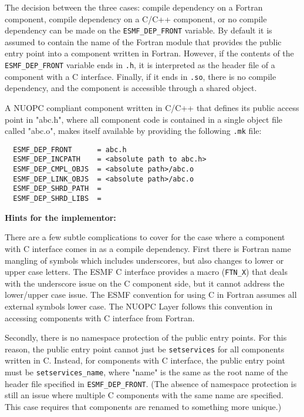 The decision between the three cases: compile dependency on a Fortran component, compile dependency on a C/C++ component, or no compile dependency can be made on the {\tt ESMF\_DEP\_FRONT} variable. By default it is assumed to contain the name of the Fortran module that provides the public entry point into a component written in Fortran. However, if the contents of the {\tt ESMF\_DEP\_FRONT} variable ends in {\tt .h}, it is interpreted as the header file of a component with a C interface. Finally, if it ends in {\tt .so}, there is no compile dependency, and the component is accessible through a shared object.

A NUOPC compliant component written in C/C++ that defines its public access point in "abc.h", where all component code is contained in a single object file called "abc.o", makes itself available by providing the following {\tt .mk} file:

\begin{verbatim}
  ESMF_DEP_FRONT      = abc.h
  ESMF_DEP_INCPATH    = <absolute path to abc.h>
  ESMF_DEP_CMPL_OBJS  = <absolute path>/abc.o
  ESMF_DEP_LINK_OBJS  = <absolute path>/abc.o
  ESMF_DEP_SHRD_PATH  = 
  ESMF_DEP_SHRD_LIBS  =
\end{verbatim}

{\bf Hints for the implementor:}

There are a few subtle complications to cover for the case where a component with C interface comes in as a compile dependency. First there is Fortran name mangling of symbols which includes underscores, but also changes to lower or upper case letters. The ESMF C interface provides a macro ({\tt FTN\_X}) that deals with the underscore issue on the C component side, but it cannot address the lower/upper case issue. The ESMF convention for using C in Fortran assumes all external symbols lower case. The NUOPC Layer follows this convention in accessing components with C interface from Fortran.

Secondly, there is no namespace protection of the public entry points. For this reason, the public entry point cannot just be {\tt setservices} for all components written in C. Instead, for components with C interface, the public entry point must be {\tt setservices\_name}, where "name" is the same as the root name of the header file specified in {\tt ESMF\_DEP\_FRONT}. (The absence of namespace protection is still an issue where multiple C components with the same name are specified. This case requires that components are renamed to something more unique.)

